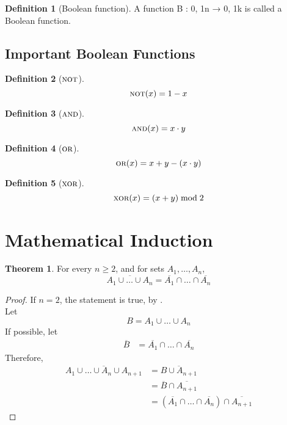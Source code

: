 \documentclass[fleqn, a4paper, 12pt, twoside]{article}
\theoremstyle{definition}
\newtheorem{definition}{Definition}
\theoremstyle{theorem}
\newtheorem{theorem}{Theorem}
\newcommand{\NOT}{{\textsc{not}}}
\newcommand{\AND}{{\textsc{and}}}
\newcommand{\OR}{{\textsc{or}}}
\newcommand{\XOR}{{\textsc{xor}}}
\begin{document}
\begin{definition}[Boolean function]
	A function B : {0, 1}n → {0, 1}k is called a Boolean function.
\end{definition}

\subsection{Important Boolean Functions}

\begin{definition}[$\NOT$]
	\begin{equation*}
		\NOT(x) = 1 - x
	\end{equation*}
\end{definition}

\begin{definition}[$\AND$]
	\begin{equation*}
		\AND(x) = x \cdot y
	\end{equation*}
\end{definition}

\begin{definition}[$\OR$]
	\begin{equation*}
		\OR(x) = x + y - (x \cdot y)
	\end{equation*}
\end{definition}

\begin{definition}[$\XOR$]
	\begin{equation*}
		\XOR(x) = (x + y) \bmod{2}
	\end{equation*}
\end{definition}

\section{Mathematical Induction}

\begin{theorem}
	For every $n \geq 2$, and for sets $A_1, \dots, A_n$,
	\begin{equation*}
		\overline{A_1 \cup \dots \cup A_n} = \overline{A_1} \cap \dots \cap \overline{A_n}
	\end{equation*}
\end{theorem}

\begin{proof}
	If $n = 2$, the statement is true, by .\\
	Let
	\begin{equation*}
		B = A_1 \cup \dots \cup A_n
	\end{equation*}
	If possible, let
	\begin{align*}
		\overline{B} &= \overline{A_1} \cap \dots \cap \overline{A_n}
	\end{align*}
	Therefore,
	\begin{align*}
		\overline{A_1 \cup \dots \cup A_n \cup A_{n + 1}} &= \overline{B \cup A_{n + 1}}\\
		&= \overline{B} \cap \overline{A_{n + 1}}\\
		&= (\overline{A_1} \cap \dots \cap \overline{A_n}) \cap \overline{A_{n + 1}}
	\end{align*}
\end{proof}
\end{document}
